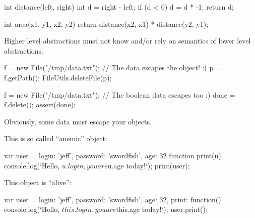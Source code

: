 \documentclass{article}
\begin{document}
\begin{pptWide}{2}
{\small\begin{ffcode}
int distance(left, right) {
  int d = right - left;
  if (d < 0) { d = d * -1; }
  return d;
}

int area(x1, y1, x2, y2) {
  return distance(x2, x1)
    * distance(y2, y1);
}
\end{ffcode}
}
\par\columnbreak\par
{}
\end{pptWide}\par
Higher level abstractions must not know and/or rely on semantics of lower level abstractions.
\plush{}

\begin{pptWide}{2}
{\small\begin{ffcode}
f = new File("/tmp/data.txt");
// The data escapes the object! :(
p = f.getPath();
FileUtils.deleteFile(p);
\end{ffcode}
}
\par\columnbreak\par
{\small\begin{ffcode}
f = new File("/tmp/data.txt");
// The boolean data escapes too :)
done = f.delete();
assert(done);
\end{ffcode}
}
\end{pptWide}
\par
Obviously, some data must escape your objects.
\plush{}

\begin{pptWide}{2}
This is so called ``anemic'' object:
{\small\begin{ffcode}
var user = {
  login: 'jeff',
  password: 'swordfish',
  age: 32
}
function print(u) {
  console.log(`Hello, ${u.login},
    you are ${u.age} today!`);
}
print(user);
\end{ffcode}
}
\par\columnbreak\par
This object is ``alive'':
{\small\begin{ffcode}
var user = {
  login: 'jeff',
  password: 'swordfish',
  age: 32,
  print: function() {
    console.log(`Hello, ${this.login},
      you are ${this.age} today!`);
  }
}
user.print();
\end{ffcode}
}
\end{pptWide}
\par
\plush{}
\end{document}
